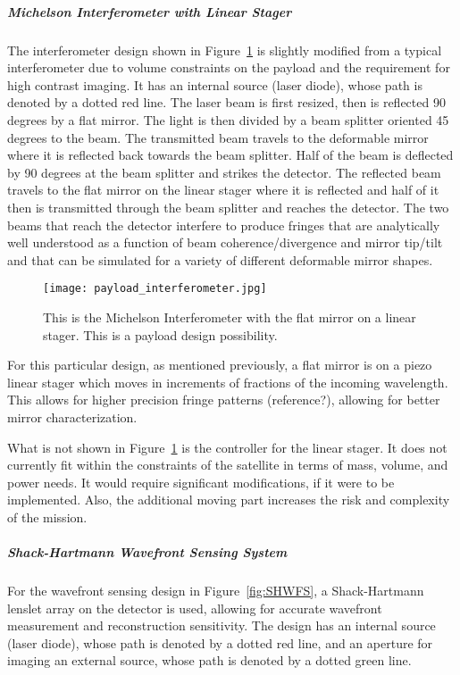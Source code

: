 \documentclass[12pt]{article}
\begin{document}
\subparagraph{Michelson Interferometer with Linear Stager}
The interferometer design shown in Figure~\ref{fig:interferometer} is slightly modified from a typical interferometer due to volume constraints on the payload and the requirement for high contrast imaging. It has an internal source (laser diode), whose path is denoted by a dotted red line.
The laser beam is first resized, then is reflected 90 degrees by a flat mirror. The light is then divided by a beam splitter oriented 45 degrees to the beam. The transmitted beam travels to the deformable mirror where it is reflected back towards the beam splitter. Half of the beam is deflected by 90 degrees at the beam splitter and strikes the detector. The reflected beam travels to the flat mirror on the linear stager where it is reflected and half of it then is transmitted through the beam splitter and reaches the detector. The two beams that reach the detector interfere to produce fringes that are analytically well understood as a function of beam coherence/divergence and mirror tip/tilt \cite{demtroeder} and that can be simulated for a variety of different deformable mirror shapes.

\begin{figure}[ht]
\centering
  \texttt{[image: payload\_interferometer.jpg]}
\caption{This is the Michelson Interferometer with the flat mirror on a linear stager.  This is a payload design possibility.}
\label{fig:interferometer}
\end{figure}

For this particular design, as mentioned previously, a flat mirror is on a piezo linear stager which moves in increments of fractions of the incoming wavelength. This allows for higher precision fringe patterns (reference?), allowing for better mirror characterization.

What is not shown in Figure~\ref{fig:interferometer} is the controller for the linear stager. It does not currently fit within the constraints of the satellite in terms of mass, volume, and power needs. It would require significant modifications, if it were to be implemented. Also, the additional moving part increases the risk and complexity of the mission.

\subparagraph{Shack-Hartmann Wavefront Sensing System}
For the wavefront sensing design in Figure~\ref{fig:SHWFS}, a Shack-Hartmann lenslet array on the detector is used, allowing for accurate wavefront measurement and reconstruction sensitivity. The design has an internal source (laser diode), whose path is denoted by a dotted red line, and an aperture for imaging an external source, whose path is denoted by a dotted green line.
\end{document}

